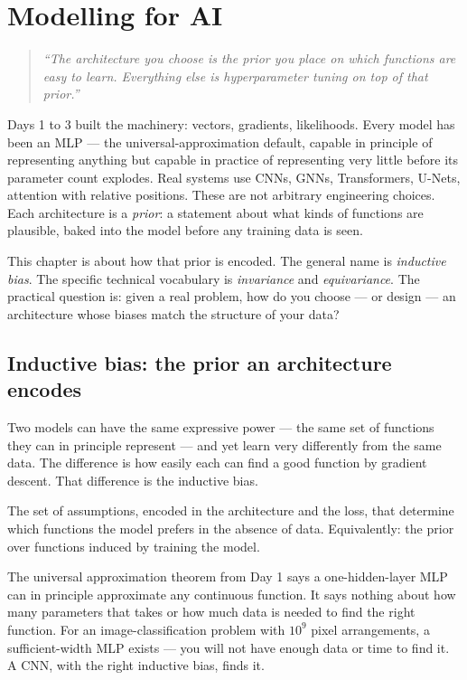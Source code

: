 \chapter{Modelling for AI}
\label{ch:day4}

\begin{quote}
\emph{``The architecture you choose is the prior you place on which functions are easy to learn. Everything else is hyperparameter tuning on top of that prior.''}
\end{quote}

Days 1 to 3 built the machinery: vectors, gradients, likelihoods. Every model has been an MLP --- the universal-approximation default, capable in principle of representing anything but capable in practice of representing very little before its parameter count explodes. Real systems use CNNs, GNNs, Transformers, U-Nets, attention with relative positions. These are not arbitrary engineering choices. Each architecture is a \emph{prior}: a statement about what kinds of functions are plausible, baked into the model before any training data is seen.

This chapter is about how that prior is encoded. The general name is \emph{inductive bias}. The specific technical vocabulary is \emph{invariance} and \emph{equivariance}. The practical question is: given a real problem, how do you choose --- or design --- an architecture whose biases match the structure of your data?

\section{Inductive bias: the prior an architecture encodes}

Two models can have the same expressive power --- the same set of functions they can in principle represent --- and yet learn very differently from the same data. The difference is how easily each can find a good function by gradient descent. That difference is the inductive bias.

\begin{definition}
The set of assumptions, encoded in the architecture and the loss, that determine which functions the model prefers in the absence of data. Equivalently: the prior over functions induced by training the model.
\end{definition}

The universal approximation theorem from Day 1 says a one-hidden-layer MLP can in principle approximate any continuous function. It says nothing about how many parameters that takes or how much data is needed to find the right function. For an image-classification problem with $10^9$ pixel arrangements, a sufficient-width MLP exists --- you will not have enough data or time to find it. A CNN, with the right inductive bias, finds it.

